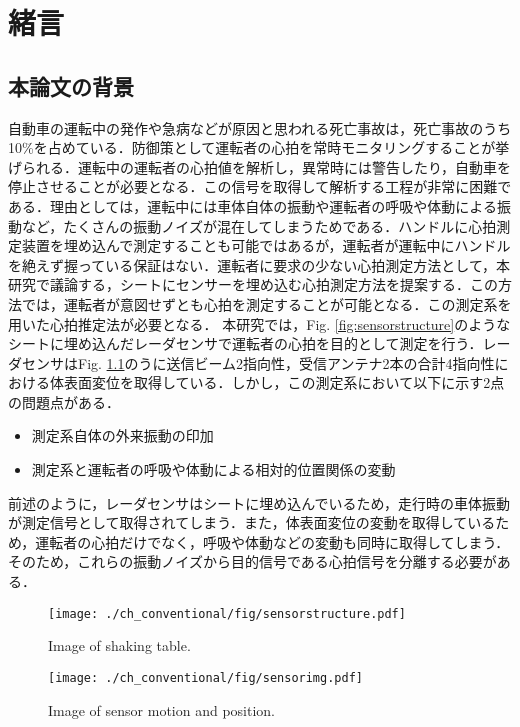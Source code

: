 \chapter{緒言}
\label{chap:intro}

\section{本論文の背景}
自動車の運転中の発作や急病などが原因と思われる死亡事故は，死亡事故のうち10\%を占めている．防御策として運転者の心拍を常時モニタリングすることが挙げられる．運転中の運転者の心拍値を解析し，異常時には警告したり，自動車を停止させることが必要となる．この信号を取得して解析する工程が非常に困難である．理由としては，運転中には車体自体の振動や運転者の呼吸や体動による振動など，たくさんの振動ノイズが混在してしまうためである．ハンドルに心拍測定装置を埋め込んで測定することも可能ではあるが，運転者が運転中にハンドルを絶えず握っている保証はない．運転者に要求の少ない心拍測定方法として，本研究で議論する，シートにセンサーを埋め込む心拍測定方法を提案する．この方法では，運転者が意図せずとも心拍を測定することが可能となる．この測定系を用いた心拍推定法が必要となる．
本研究では，Fig. \ref{fig:sensorstructure}のようなシートに埋め込んだレーダセンサで運転者の心拍を目的として測定を行う．レーダセンサはFig. \ref{fig:sensorimg}のうに送信ビーム2指向性，受信アンテナ2本の合計4指向性における体表面変位を取得している．しかし，この測定系において以下に示す2点の問題点がある．

\begin{itemize}
 \item 測定系自体の外来振動の印加
 \item 測定系と運転者の呼吸や体動による相対的位置関係の変動
\end{itemize}

前述のように，レーダセンサはシートに埋め込んでいるため，走行時の車体振動が測定信号として取得されてしまう．また，体表面変位の変動を取得しているため，運転者の心拍だけでなく，呼吸や体動などの変動も同時に取得してしまう．そのため，これらの振動ノイズから目的信号である心拍信号を分離する必要がある．


\begin{figure}[htbp]
 \begin{minipage}{0.5\hsize}
  \begin{center}
   \texttt{[image: ./ch\_conventional/fig/sensorstructure.pdf]}
  \end{center}
  \caption{Image of shaking table.}
  \label{fig:sensorstructure}
 \end{minipage}
 \begin{minipage}{0.5\hsize}
  \begin{center}
   \texttt{[image: ./ch\_conventional/fig/sensorimg.pdf]}
  \end{center}
  \caption{Image of sensor motion and position.}
  \label{fig:sensorimg}
 \end{minipage}
\end{figure}

